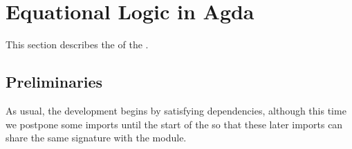\documentclass[a4paper,UKenglish,cleveref, autoref, thm-restate]{lipics-v2019}
\begin{document}
\begin{comment}
The converse of membership-equiv-gives-carrier-equality is obvious.
\begin{code}\end{code}

\subsection{The type of Subalgebras in Agda}\label{the-type-of-subalgebras-in-agda}
Finally, we define, once and for all, the type of subalgebras of an algebra (resp., subalgebras of algebras in a class of algebras) that we will use in the sequel.
\begin{code}\end{code}
\end{comment}


\section{Equational Logic in Agda}\label{equational-logic-in-agda}
This section describes the \closuremodule of the \agdaualib.

\subsection{Preliminaries}\label{preliminaries}
As usual, the development begins by satisfying dependencies, although this time we postpone some imports until the start of the \closuremodule so that these later imports can share the same signature with the module.

\begin{code}
\>[0]\AgdaSymbol{\{-\#}\AgdaSpace{}%
\AgdaSpace{}%
\AgdaSpace{}%
\AgdaSpace{}%
\AgdaSpace{}%
\AgdaSymbol{\#-\}}\<%
\\
%
\\[\AgdaEmptyExtraSkip]%
\>[0]\AgdaSpace{}%
\AgdaSpace{}%
\<%
\\
\>[0]\AgdaSpace{}%
\AgdaSpace{}%
\AgdaSpace{}%
\AgdaSpace{}%
\AgdaSymbol{(}\AgdaSymbol{;}\AgdaSpace{}%
\AgdaSymbol{;}\AgdaSpace{}%
\AgdaSymbol{)}\<%
\end{code}
\end{document}
